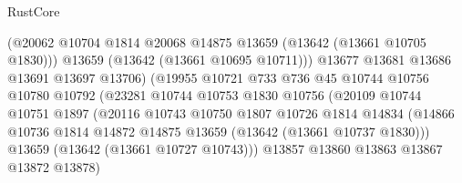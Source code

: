\begin{lexlean}{RustCore}
\begin{coremodule}
                                      (@20062
                                        @10704
                                        @1814
                                        @20068
                                        @14875
                                        @13659
                                        (@13642 (@13661 @10705 @1830)))
                                      @13659
                                      (@13642 (@13661 @10695 @10711)))
                                    @13677
                                    @13681
                                    @13686
                                    @13691
                                    @13697
                                    @13706)
                                  (@19955
                                    @10721
                                    @733
                                    @736
                                    @45
                                    @10744
                                    @10756
                                    @10780
                                    @10792
                                    (@23281
                                      @10744
                                      @10753
                                      @1830
                                      @10756
                                      (@20109
                                        @10744
                                        @10751
                                        @1897
                                        (@20116
                                          @10743
                                          @10750
                                          @1807
                                          @10726
                                          @1814
                                          @14834
                                          (@14866
                                            @10736
                                            @1814
                                            @14872
                                            @14875
                                            @13659
                                            (@13642 (@13661 @10737 @1830)))
                                          @13659
                                          (@13642 (@13661 @10727 @10743)))
                                        @13857
                                        @13860
                                        @13863
                                        @13867
                                        @13872
                                        @13878)

\end{coremodule}
\end{lexlean}
